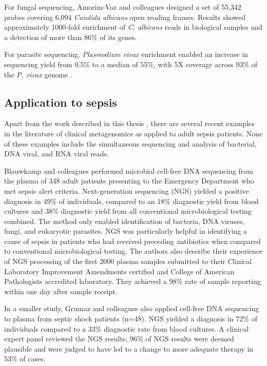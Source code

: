 For fungal sequencing, Amorim-Vaz and colleagues \parencite{Amorim-Vaz2015} designed a set of 55,342 probes covering 6,094 \textit{Candida albicans} open reading frames. Results showed approximately 1000-fold enrichment of \textit{C. albicans} reads in biological samples and a detection of more than 86\% of its genes. 

For parasite sequencing, \textit{Plasmodium vivax} enrichment enabled an increase in sequencing yield from 0.5\% to a median of 55\%, with 5X coverage across 93\% of the \textit{P. vivax} genome \parencite{Bright2012}.

\subsection{Application to sepsis}
Apart from the work described in this thesis \parencite{Goh2019}, there are several recent examples in the literature of clinical metagenomics as applied to adult sepsis patients. None of these examples include the simultaneous sequencing and analysis of bacterial, DNA viral, and RNA viral reads. 

Blauwkamp and colleagues \parencite{Blauwkamp2019} performed microbial cell-free DNA sequencing from the plasma of 348 adult patients presenting to the Emergency Department who met sepsis alert criteria. Next-generation sequencing (NGS) yielded a positive diagnosis in 49\% of individuals, compared to an 18\% diagnostic yield from blood cultures and 38\% diagnostic yield from all conventional microbiological testing combined. The method only enabled identification of bacteria, DNA viruses, fungi, and eukaryotic parasites. NGS was particularly helpful in identifying a cause of sepsis in patients who had received preceding antibiotics when compared to conventional microbiological testing. The authors also describe their experience of NGS processing of the first 2000 plasma samples submitted to their Clinical Laboratory Improvement Amendments certified and College of American Pathologists accredited laboratory. They achieved a 98\% rate of sample reporting within one day after sample receipt.

In a smaller study, Grumaz and colleagues \parencite{Grumaz2019} also applied cell-free DNA sequencing to plasma from septic shock patients (n=48). NGS yielded a diagnosis in 72\% of individuals compared to a 33\% diagnostic rate from blood cultures. A clinical expert panel reviewed the NGS results; 96\% of NGS results were deemed plausible and were judged to have led to a change to more adequate therapy in 53\% of cases.

